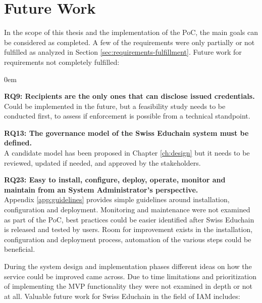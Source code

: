 \section{Future Work} \label{sec:future-work}

In the scope of this thesis and the implementation of the PoC, the main goals can be considered as completed. A few of the requirements were only partially or not fulfilled as analyzed in Section \ref{sec:requirements-fulfillment}. Future work for requirements not completely fulfilled:

\begin{description}
	\itemsep0em
	\item\textbf{RQ9: Recipients are the only ones that can disclose issued credentials.} \\
	Could be implemented in the future, but a feasibility study needs to be conducted first, to assess if enforcement is possible from a technical standpoint.
	\item\textbf{RQ13: The governance model of the Swiss Educhain system must be defined.} \\
	A candidate model has been proposed in Chapter \ref{ch:design} but it needs to be reviewed, updated if needed, and approved by the stakeholders.
	\item\textbf{RQ23: Easy to install, configure, deploy, operate, monitor and maintain from an System Administrator's perspective.} \\
	Appendix \ref{app:guidelines} provides simple guidelines around installation, configuration and deployment. Monitoring and maintenance were not examined as part of the PoC, best practices could be easier identified after Swiss Educhain is released and tested by users. Room for improvement exists in the installation, configuration and deployment process, automation of the various steps could be beneficial.
\end{description} 

During the system design and implementation phases different ideas on how the service could be improved came across. Due to time limitations and prioritization of implementing the MVP functionality they were not examined in depth or not at all. Valuable future work for Swiss Educhain in the field of IAM includes:

